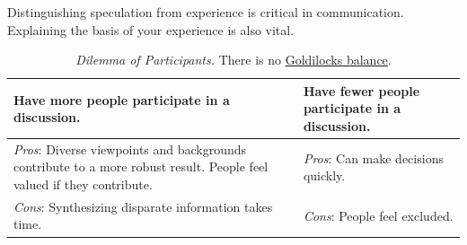 Distinguishing speculation from experience is critical in communication. Explaining the basis of your experience is also vital. 


\begin{center}
\begin{table}[H] %
\begin{tabular}{ | m{\dilemmatablewidth}| m{\dilemmatablewidth} | }
  \hline
  \textbf{Have more people participate in a discussion.} & 
  \textbf{Have fewer people participate in a discussion.} \\ 
  \hline
  \textit{Pros}: Diverse viewpoints and backgrounds contribute to a more robust result. People feel valued if they contribute. & 
  \textit{Pros}: Can make decisions quickly. \\  
  \hline
  \textit{Cons}: Synthesizing disparate information takes time. & 
  \textit{Cons}: People feel excluded. \\  
  \hline
\end{tabular}
\caption{
\textit{Dilemma of Participants.}
There is no \href{https://en.wikipedia.org/wiki/Goldilocks_principle}{Goldilocks balance}.
}
\label{table:dilemma-how-many-participants}
\end{table}
\end{center}
 



